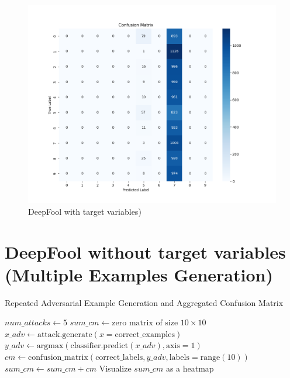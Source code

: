 \documentclass[11pt,onside]{article}
\begin{document}
\begin{figure}[h]
\centering
\includegraphics[width=1\textwidth]{V1_images/DeepFool_with_target.png}
\caption{DeepFool with target variables)}
\label{fig: DeepFool with target variables}
\end{figure}



\section{DeepFool without target variables (Multiple Examples Generation)}
\begin{algorithm}[H]
\caption{Repeated Adversarial Example Generation and Aggregated Confusion Matrix}
\begin{algorithmic}[1]
\State $num\_attacks \gets 5$
\State $sum\_cm \gets \text{zero matrix of size } 10 \times 10$
    \State $x\_adv \gets \text{attack.generate}(x=\text{correct\_examples})$
    \State $y\_adv \gets \text{argmax}(\text{classifier.predict}(x\_adv), \text{axis}=1)$
    \State $cm \gets \text{confusion\_matrix}(\text{correct\_labels}, y\_adv, \text{labels}=\text{range}(10))$
    \State $sum\_cm \gets sum\_cm + cm$
\EndFor
\State Visualize $sum\_cm$ as a heatmap
\end{algorithmic}
\end{algorithm}
\end{document}
